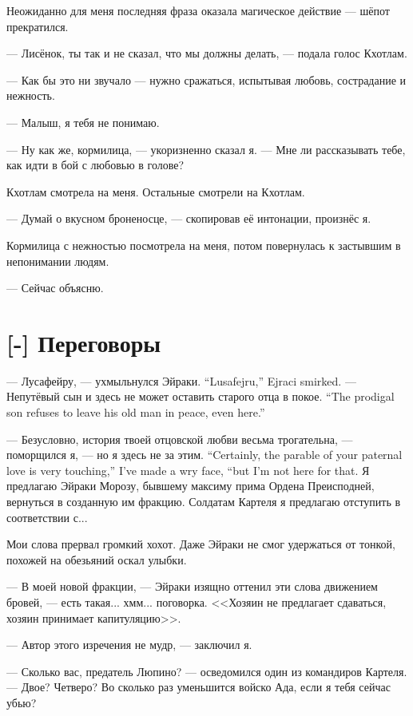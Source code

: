 Неожиданно для меня последняя фраза оказала магическое действие --- шёпот прекратился.

--- Лисёнок, ты так и не сказал, что мы должны делать, --- подала голос Кхотлам.

--- Как бы это ни звучало --- нужно сражаться, испытывая любовь, сострадание и нежность.

--- Малыш, я тебя не понимаю.

--- Ну как же, кормилица, --- укоризненно сказал я.
--- Мне ли рассказывать тебе, как идти в бой с любовью в голове?

Кхотлам смотрела на меня.
Остальные смотрели на Кхотлам.

--- Думай о вкусном броненосце, --- скопировав её интонации, произнёс я.

Кормилица с нежностью посмотрела на меня, потом повернулась к застывшим в непонимании людям.

--- Сейчас объясню.

\section{[-] Переговоры}

\textspace

{--- Лусафейру, --- ухмыльнулся Эйраки.}
{``Lusafejru,'' Ejraci smirked.}
{--- Непутёвый сын и здесь не может оставить старого отца в покое.}
{``The prodigal son refuses to leave his old man in peace, even here.''}

{--- Безусловно, история твоей отцовской любви весьма трогательна, --- поморщился я, --- но я здесь не за этим.}
{``Certainly, the parable of your paternal love is very touching,'' I've made a wry face, ``but I'm not here for that.}
Я предлагаю Эйраки Морозу, бывшему максиму прима Ордена Преисподней, вернуться в созданную им фракцию.
Солдатам Картеля я предлагаю отступить в соответствии с...

Мои слова прервал громкий хохот.
Даже Эйраки не смог удержаться от тонкой, похожей на обезьяний оскал улыбки.

--- В моей новой фракции, --- Эйраки изящно оттенил эти слова движением бровей, --- есть такая... хмм... поговорка.
<<Хозяин не предлагает сдаваться, хозяин принимает капитуляцию>>.

--- Автор этого изречения не мудр, --- заключил я.

--- Сколько вас, предатель Люпино? --- осведомился один из командиров Картеля.
--- Двое?
Четверо?
Во сколько раз уменьшится войско Ада, если я тебя сейчас убью?

